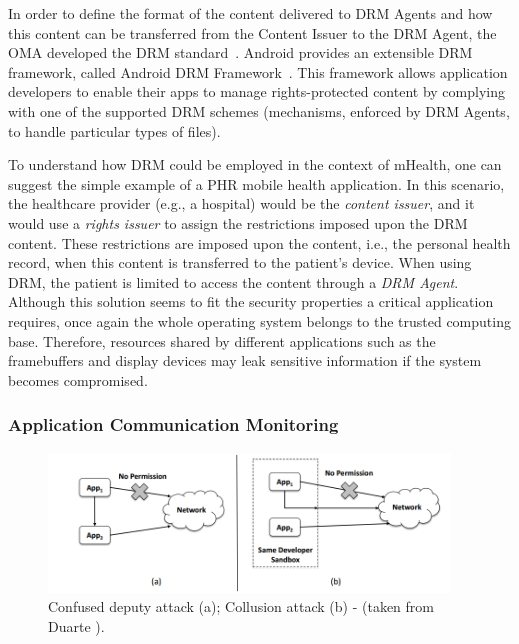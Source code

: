 In order to define the format of the content delivered to DRM Agents and how this content can be transferred from the Content Issuer to the DRM Agent, the \ac{OMA} developed the DRM standard~\cite{drm}. Android provides an extensible DRM framework, called Android DRM Framework~\cite{android_drm}. This framework allows application developers to enable their apps to manage rights-protected content by complying with one of the supported DRM schemes (mechanisms, enforced by DRM Agents, to handle particular types of files).

To understand how \ac{DRM} could be employed in the context of mHealth, one can suggest the simple example of a \ac{PHR} mobile health application. In this scenario, the healthcare provider (e.g., a hospital) would be the \emph{content issuer}, and it would use a \emph{rights issuer} to assign the restrictions imposed upon the \ac{DRM} content. These restrictions are imposed upon the content, i.e., the personal health record, when this content is transferred to the patient's device. When using \ac{DRM}, the patient is limited to access the content through a \emph{\ac{DRM} Agent}. Although this solution seems to fit the security properties a critical application requires, once again the whole operating system belongs to the trusted computing base. Therefore, resources shared by different applications such as the framebuffers and display devices may leak sensitive information if the system becomes compromised.

\subsubsection{Application Communication Monitoring}

\begin{figure}[t!]
	\centering
	\includegraphics[width=0.95\textwidth]{img/communicationattacks.png}
	\caption{Confused deputy attack (a); Collusion attack (b) - (taken from Duarte \cite{nunoduarte}).}
	\label{fig:communicationattacks}
\end{figure}

